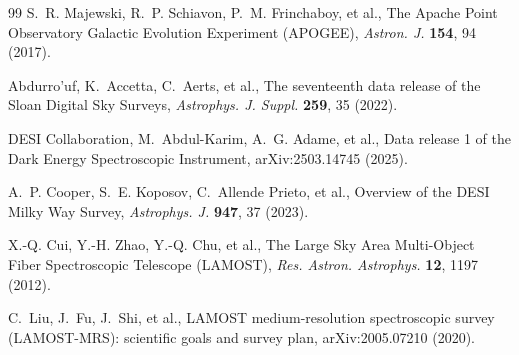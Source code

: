 \documentclass[3p,11pt]{elsarticle}
\begin{document}
\begin{thebibliography}{99}
S.~R. Majewski, R.~P. Schiavon, P.~M. Frinchaboy, et al., The Apache Point Observatory
Galactic Evolution Experiment (APOGEE), \emph{Astron. J.} \textbf{154}, 94 (2017).

Abdurro'uf, K.~Accetta, C.~Aerts, et al., The seventeenth data release of the Sloan
Digital Sky Surveys, \emph{Astrophys. J. Suppl.} \textbf{259}, 35 (2022).

DESI Collaboration, M.~Abdul-Karim, A.~G. Adame, et al., Data release 1 of the Dark
Energy Spectroscopic Instrument, arXiv:2503.14745 (2025).

A.~P. Cooper, S.~E. Koposov, C.~Allende Prieto, et al., Overview of the DESI Milky Way
Survey, \emph{Astrophys. J.} \textbf{947}, 37 (2023).

X.-Q. Cui, Y.-H. Zhao, Y.-Q. Chu, et al., The Large Sky Area Multi-Object Fiber
Spectroscopic Telescope (LAMOST), \emph{Res. Astron. Astrophys.} \textbf{12}, 1197
(2012).

C.~Liu, J.~Fu, J.~Shi, et al., LAMOST medium-resolution spectroscopic survey
(LAMOST-MRS): scientific goals and survey plan, arXiv:2005.07210 (2020).

\end{thebibliography}
\end{document}
